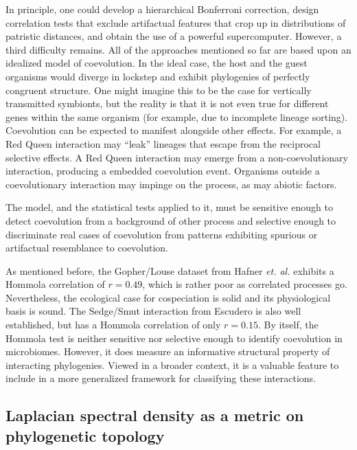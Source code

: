 

In principle, one could develop a hierarchical Bonferroni correction, design correlation tests that exclude artifactual features that crop up in distributions of patristic distances, and obtain the use of a powerful supercomputer. However, a third difficulty remains. All of the approaches mentioned so far are based upon an idealized model of coevolution. In the ideal case, the host and the guest organisms would diverge in lockstep and exhibit phylogenies of perfectly congruent structure. One might imagine this to be the case for vertically transmitted symbionts, but the reality is that it is not even true for different genes within the same organism (for example, due to incomplete lineage sorting). Coevolution can be expected to manifest alongside other effects. For example, a Red Queen interaction may ``leak'' lineages that escape from the reciprocal selective effects. A Red Queen interaction may emerge from a non-coevolutionary interaction, producing a embedded coevolution event. Organisms outside a coevolutionary interaction may impinge on the process, as may abiotic factors.

The model, and the statistical tests applied to it, must be sensitive enough to detect coevolution from a background of other process and selective enough to discriminate real cases of coevolution from patterns exhibiting spurious or artifactual resemblance to coevolution.

As mentioned before, the Gopher/Louse dataset from Hafner {\em et. al.} exhibits a Hommola correlation of $r=0.49$, which is rather poor as correlated processes go. Nevertheless, the ecological case for cospeciation is solid and its physiological basis is sound. The Sedge/Smut interaction from Escudero \cite{escudero2015phylogenetic} is also well established, but has a Hommola correlation of only $r=0.15$. By itself, the Hommola test is neither sensitive nor selective enough to identify coevolution in microbiomes. However, it does measure an informative structural property of interacting phylogenies. Viewed in a broader context, it is a valuable feature to include in a more generalized framework for classifying these interactions.

\subsection{Laplacian spectral density as a metric on phylogenetic topology}

